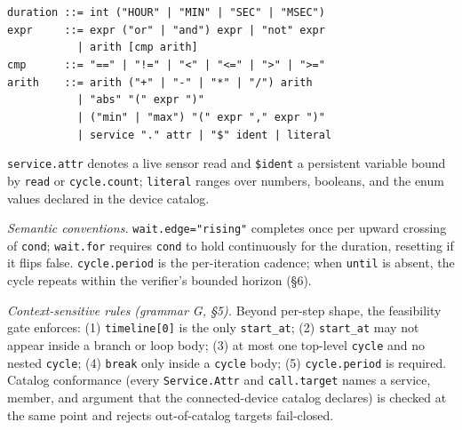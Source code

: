 {\begin{flushleft}
\texttt{duration ::= int ("HOUR" | "MIN" | "SEC" | "MSEC")}\\[3pt]
\texttt{expr \ \ \ \ ::= expr ("or" | "and") expr | "not" expr}\\
\texttt{\ \ \ \ \ \ \ \ \ \ \ | arith [cmp arith]}\\
\texttt{cmp \ \ \ \ \ ::= "==" | "!=" | "<" | "<=" | ">" | ">="}\\
\texttt{arith \ \ \ ::= arith ("+" | "-" | "*" | "/") arith}\\
\texttt{\ \ \ \ \ \ \ \ \ \ \ | "abs" "(" expr ")"}\\
\texttt{\ \ \ \ \ \ \ \ \ \ \ | ("min" | "max") "(" expr "," expr ")"}\\
\texttt{\ \ \ \ \ \ \ \ \ \ \ | service "." attr | "\$" ident | literal}
\end{flushleft}
}

\noindent\texttt{service.attr} denotes a live sensor read and \texttt{\$}\texttt{ident} a persistent variable bound by \texttt{read} or \texttt{cycle.count}; \texttt{literal} ranges over numbers, booleans, and the enum values declared in the device catalog.

\noindent\emph{Semantic conventions.} \texttt{wait.edge="rising"} completes once per upward crossing of \texttt{cond}; \texttt{wait.for} requires \texttt{cond} to hold continuously for the duration, resetting if it flips false. \texttt{cycle.period} is the per-iteration cadence; when \texttt{until} is absent, the cycle repeats within the verifier's bounded horizon (\S6).

\noindent\emph{Context-sensitive rules (grammar G, \S5).} Beyond per-step shape, the feasibility gate enforces: (1) \texttt{timeline[0]} is the only \texttt{start\_at}; (2) \texttt{start\_at} may not appear inside a branch or loop body; (3) at most one top-level \texttt{cycle} and no nested \texttt{cycle}; (4) \texttt{break} only inside a \texttt{cycle} body; (5) \texttt{cycle.period} is required. Catalog conformance (every \texttt{Service.Attr} and \texttt{call.target} names a service, member, and argument that the connected-device catalog declares) is checked at the same point and rejects out-of-catalog targets fail-closed.
